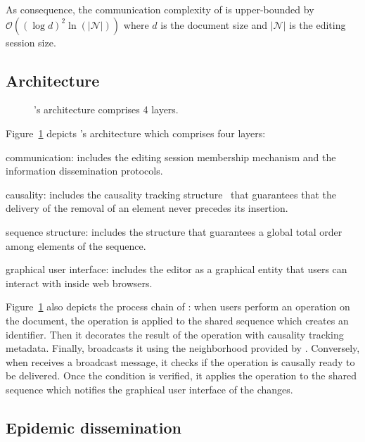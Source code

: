 As consequence, the communication complexity of \CRATE is upper-bounded by
$\mathcal{O}((\log d)^2\ln(|\mathcal{N}|))$ where $d$ is the document size and
$|\mathcal{N}|$ is the editing session size.

\subsection{Architecture}

\begin{figure}
  \centering
  
  \caption{\label{fig:architecture}\CRATE's architecture comprises 4
    layers.}
\end{figure}

Figure~\ref{fig:architecture} depicts \CRATE's architecture which comprises four
layers:
\begin{inparaenum}[(i)]
\item communication: includes the editing session membership mechanism and the
  information dissemination protocols.
\item causality: includes the causality tracking
  structure~\cite{malkhi2007concise} that guarantees that the delivery of the
  removal of an element never precedes its insertion.
\item sequence structure: includes the structure that guarantees a global
  total order among elements of the sequence.
\item graphical user interface: includes the editor as a graphical entity that
  users can interact with inside web browsers.
\end{inparaenum}
Figure~\ref{fig:architecture} also depicts the process chain of \CRATE: when
users perform an operation on the document, the operation is applied to the
shared sequence which creates an \LSEQ identifier. Then it decorates the result
of the operation with causality tracking metadata. Finally, \CRATE broadcasts it
using the neighborhood provided by \SPRAY.  Conversely, when \CRATE receives a
broadcast message, it checks if the operation is causally ready to be
delivered. Once the condition is verified, it applies the operation to the
shared sequence which notifies the graphical user interface of the changes.



\subsection{Epidemic dissemination}
\label{subsec:gossiping}

